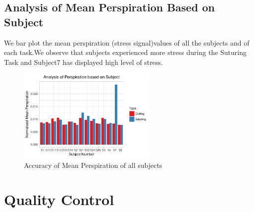 \documentclass[12pt,epsf]{report}
\begin{document}
{\subsection*{Analysis of Mean Perspiration Based on Subject}
We bar plot the mean perspiration (stress signal)values of all the subjects and of each task.We observe that subjects experienced more stress during the Suturing Task and Subject7 has displayed high level of stress.\\
\begin{figure}[!htb]
	\centering
	\includegraphics[width=0.6\textwidth]{SubjectVsPP.pdf}
	\caption{Accuracy of Mean Perspiration of all subjects}
	\centering
\end{figure}
\newpage
\FloatBarrier
\section*{Quality Control}
\FloatBarrier
}
\end{document}

